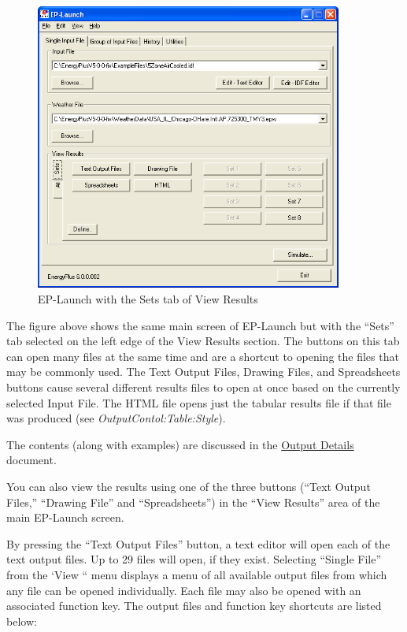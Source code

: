 \begin{figure}[hbtp] %
\centering
\includegraphics[width=0.9\textwidth, height=0.9\textheight, keepaspectratio=true]{media/image006.png}
\caption{EP-Launch with the Sets tab of View Results \protect \label{fig:ep-launch-with-the-sets-tab-of-view-results}}
\end{figure}

The figure above shows the same main screen of EP-Launch but with the ``Sets'' tab selected on the left edge of the View Results section. The buttons on this tab can open many files at the same time and are a shortcut to opening the files that may be commonly used. The Text Output Files, Drawing Files, and Spreadsheets buttons cause several different results files to open at once based on the currently selected Input File. The HTML file opens just the tabular results file if that file was produced (see \emph{OutputContol:Table:Style}).

The contents (along with examples) are discussed in the \href{OutputDetailsAndExamples.pdf}{Output Details} document.

You can also view the results using one of the three buttons (``Text Output Files,'' ``Drawing File'' and ``Spreadsheets'') in the ``View Results'' area of the main EP-Launch screen.

By pressing the ``Text Output Files'' button, a text editor will open each of the text output files. Up to 29 files will open, if they exist. Selecting ``Single File'' from the `View `` menu displays a menu of all available output files from which any file can be opened individually. Each file may also be opened with an associated function key. The output files and function key shortcuts are listed below:

